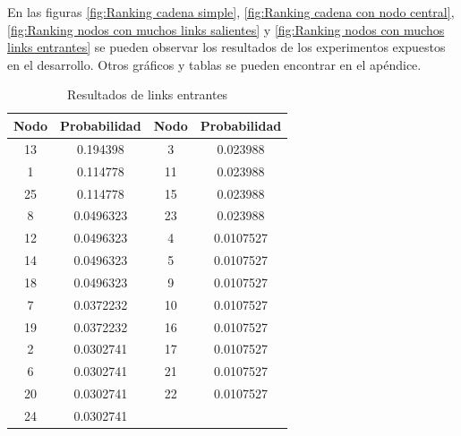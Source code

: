 En las figuras \ref{fig:Ranking cadena simple}, \ref{fig:Ranking cadena con nodo central}, \ref{fig:Ranking nodos con muchos links salientes} y \ref{fig:Ranking nodos con muchos links entrantes} se pueden observar los resultados de los experimentos expuestos en el desarrollo.
Otros gráficos y tablas se pueden encontrar en el apéndice.

\begin{table}[H]
\centering
	\begin{tabular}{|c|c|c|c|}
		\hline
		Nodo & Probabilidad & Nodo & Probabilidad \\ \hline
		13   & 0.194398     & 3    & 0.023988     \\
		1    & 0.114778     & 11   & 0.023988     \\
		25   & 0.114778     & 15   & 0.023988     \\
		8    & 0.0496323    & 23   & 0.023988     \\
		12   & 0.0496323    & 4    & 0.0107527    \\
		14   & 0.0496323    & 5    & 0.0107527    \\
		18   & 0.0496323    & 9    & 0.0107527    \\
		7    & 0.0372232    & 10   & 0.0107527    \\
		19   & 0.0372232    & 16   & 0.0107527    \\
		2    & 0.0302741    & 17   & 0.0107527    \\
		6    & 0.0302741    & 21   & 0.0107527    \\
		20   & 0.0302741    & 22   & 0.0107527    \\
		24   & 0.0302741    & ~    & ~            \\ \hline
	\end{tabular}
\caption{Resultados de links entrantes}
\end{table}


